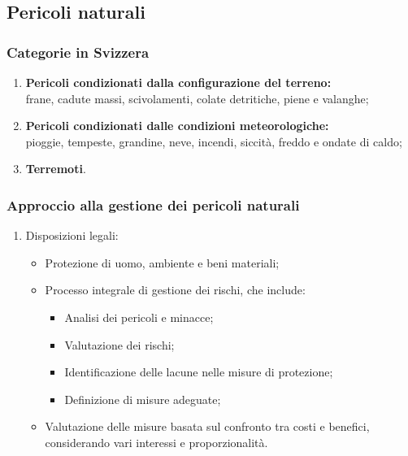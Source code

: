 \documentclass{article}
\begin{document}
\subsection{Pericoli naturali}

\subsubsection{Categorie in Svizzera}
\begin{enumerate}
    \item \textbf{Pericoli condizionati dalla configurazione del terreno:}\\
        frane, cadute massi, scivolamenti, colate detritiche, piene e valanghe;
    \item \textbf{Pericoli condizionati dalle condizioni meteorologiche:}\\
        pioggie, tempeste, grandine, neve, incendi, siccità, freddo e ondate di caldo;
    \item \textbf{Terremoti}.
\end{enumerate}

\subsubsection{Approccio alla gestione dei pericoli naturali}
\begin{enumerate}
    \item Disposizioni legali:
        \begin{itemize}
            \item Protezione di uomo, ambiente e beni materiali;
            \item Processo integrale di gestione dei rischi, che include:
                \begin{itemize}
                    \item Analisi dei pericoli e minacce;
                    \item Valutazione dei rischi;
                    \item Identificazione delle lacune nelle misure di protezione;
                    \item Definizione di misure adeguate;
                \end{itemize}
            \item Valutazione delle misure basata sul confronto tra costi e benefici,
                considerando vari interessi e proporzionalità.
        \end{itemize}
\end{enumerate}
\end{document}
